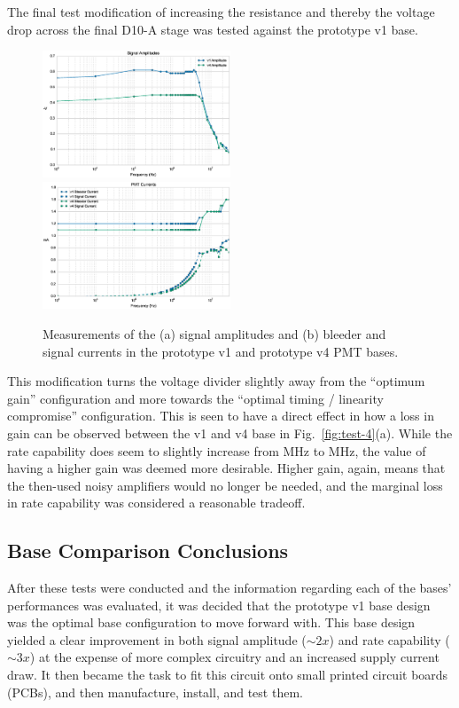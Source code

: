 The final test modification of increasing the resistance and thereby the voltage drop across the final D10-A stage was tested against the prototype v1 base.

\begin{figure}[h]
	\centerline{
		\mbox{\includegraphics[width=0.5\textwidth]{figures/Test_v4_Amp.eps} \includegraphics[width=0.5\textwidth]{figures/Test_v4_Current.eps}}}
	\caption{Measurements of the (a) signal amplitudes and (b) bleeder and signal currents in the prototype v1 and prototype v4 PMT bases.}
	\label{fig:test-v4}
\end{figure}

This modification turns the voltage divider slightly away from the ``optimum gain'' configuration and more towards the ``optimal timing / linearity compromise'' configuration. This is seen to have a direct effect in how a loss in gain can be observed between the v1 and v4 base in Fig.~\ref{fig:test-4}(a). While the rate capability does seem to slightly increase from \unit[4]{MHz} to \unit[5]{MHz}, the value of having a higher gain was deemed more desirable. Higher gain, again, means that the then-used noisy amplifiers would no longer be needed, and the marginal loss in rate capability was considered a reasonable tradeoff.

\subsection{Base Comparison Conclusions}

After these tests were conducted and the information regarding each of the bases' performances was evaluated, it was decided that the prototype v1 base design was the optimal base configuration to move forward with. This base design yielded a clear improvement in both signal amplitude ($\sim2x$) and rate capability ($\sim3x$) at the expense of more complex circuitry and an increased supply current draw. It then became the task to fit this circuit onto small printed circuit boards (PCBs), and then manufacture, install, and test them.

